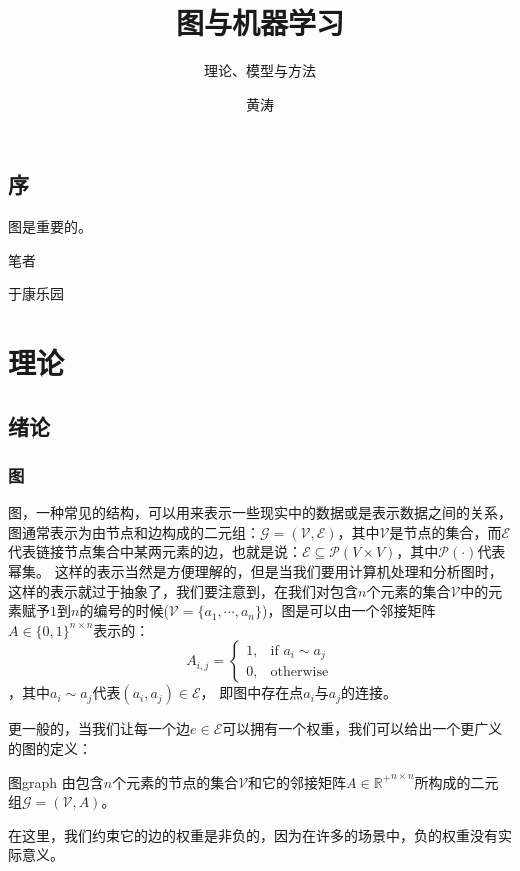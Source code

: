 \documentclass[color=gray,base=hide,cn]{elegantbook}
\title{图与机器学习}
\subtitle{理论、模型与方法}
\author{黄涛}
\institute{中山大学数学学院}
\date{}
\begin{document}
\maketitle


\chapter*{序}
图是重要的。
\begin{flushright}
    笔者

    于康乐园
\end{flushright}

\tableofcontents
\mainmatter
\hypersetup{pageanchor=true}
\part{理论}
\chapter{绪论}
\section{图}
图，一种常见的结构，可以用来表示一些现实中的数据或是表示数据之间的关系，图通常表示为由节点和边构成的二元组：$\mathcal{G} = (\mathcal{V},\mathcal{E})$，其中$\mathcal{V}$是节点的集合，而$\mathcal{E}$代表链接节点集合中某两元素的边，也就是说：$\mathcal{E} \subseteq \mathcal{P}(V \times V)$，其中$\mathcal{P}(\cdot)$代表幂集。
这样的表示当然是方便理解的，但是当我们要用计算机处理和分析图时，这样的表示就过于抽象了，我们要注意到，在我们对包含$n$个元素的集合$\mathcal{V}$中的元素赋予$1$到$n$的编号的时候($\mathcal{V} = \{a_1, \cdots, a_n\}$)，图是可以由一个邻接矩阵$A \in \{0,1\}^{n\times n}$表示的：
\begin{equation}
    A_{i,j} = \left\{\begin{matrix}
        1, & \text{if } a_i \sim a_j \\
        0, & \text{otherwise}
    \end{matrix}\right.
\end{equation}
，其中$a_i \sim a_j$代表$(a_i,a_j) \in \mathcal{E} $， 即图中存在点$a_i$与$a_j$的连接。

更一般的，当我们让每一个边$e\in \mathcal{E}$可以拥有一个权重，我们可以给出一个更广义的图的定义：
\begin{definition}{图}{graph}
    由包含$n$个元素的节点的集合$\mathcal{V}$和它的邻接矩阵$A \in {\mathbb{R}^{+}}^{n\times n}$所构成的二元组$\mathcal{G} = (\mathcal{V},A)$。
\end{definition}
在这里，我们约束它的边的权重是非负的，因为在许多的场景中，负的权重没有实际意义。
\end{document}
